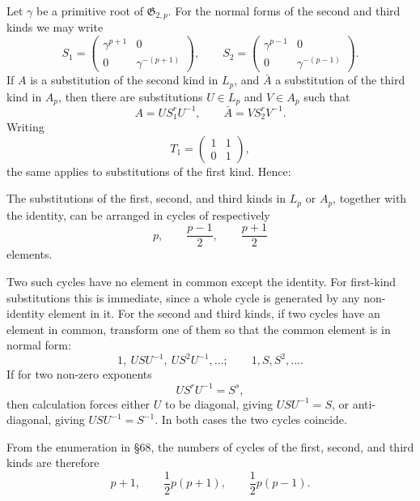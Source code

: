 \documentclass[11pt]{article}
\begin{document}
Let \(\gamma\) be a primitive root of \(\mathfrak G_{2,p}\).  For the normal forms of the second and third kinds we may write
\begin{equation}\label{eq:69-normal}
 S_1=\begin{pmatrix}\gamma^{p+1}&0\\0&\gamma^{-(p+1)}\end{pmatrix},
 \qquad
 S_2=\begin{pmatrix}\gamma^{p-1}&0\\0&\gamma^{-(p-1)}\end{pmatrix}.
\end{equation}
If \(A\) is a substitution of the second kind in \(L_p\), and \(\bar A\) a substitution of the third kind in \(A_p\), then there are substitutions \(U\in L_p\) and \(V\in A_p\) such that
\[
 A=US_1^rU^{-1},
 \qquad
 \bar A=VS_2^rV^{-1}.
\]
Writing
\[
 T_1=\begin{pmatrix}1&1\\0&1\end{pmatrix},
\]
the same applies to substitutions of the first kind.  Hence:

The substitutions of the first, second, and third kinds in \(L_p\) or \(A_p\), together with the identity, can be arranged in cycles of respectively
\[
 p,
 \qquad \frac{p-1}{2},
 \qquad \frac{p+1}{2}
\]
elements.

Two such cycles have no element in common except the identity.  For first-kind substitutions this is immediate, since a whole cycle is generated by any non-identity element in it.  For the second and third kinds, if two cycles have an element in common, transform one of them so that the common element is in normal form:
\begin{equation}\label{eq:69-12}
 1,\ USU^{-1},\ US^2U^{-1},\ldots;
 \qquad
 1,S,S^2,\ldots.
\end{equation}
If for two non-zero exponents
\[
 US^rU^{-1}=S^s,
\]
then calculation forces either \(U\) to be diagonal, giving \(USU^{-1}=S\), or anti-diagonal, giving \(USU^{-1}=S^{-1}\).  In both cases the two cycles coincide.

From the enumeration in \S 68, the numbers of cycles of the first, second, and third kinds are therefore
\begin{equation}\label{eq:69-cycle-counts}
 p+1,
 \qquad
 \frac12p(p+1),
 \qquad
 \frac12p(p-1).
\end{equation}
\end{document}
